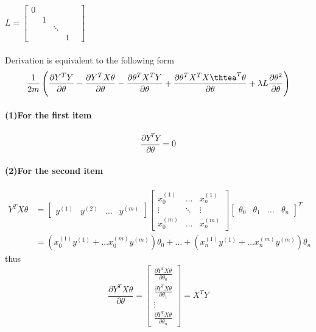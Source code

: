 \documentclass[UTF8]{article}
\begin{document}
$
  L = \left[
  \begin{matrix}
    0 &   &  & \\
      & 1 &  & \\
      &   & \ddots & \\
      &   &  & 1 &
  \end{matrix}
  \right]
$ \\ \\
Derivation is equivalent to the following form
\begin{equation*}
  \frac{1}{2m}\left(
  \frac{\partial Y^TY}{\partial \theta} - \frac{\partial Y^TX\theta}{\partial\theta} - \frac{\partial\theta^TX^TY}{\partial \theta} + \frac{\partial\theta^TX^TX\thtea^T\theta}{\partial\theta} + \lambda L\frac{\partial\theta^2}{\partial\theta}\right)
\end{equation*}

\paragraph{(1)For the first item}
$$\frac{\partial Y^TY}{\partial\theta} = 0$$
\paragraph{(2)For the second item}
\begin{align*}
  Y^TX\theta &=
  \left[
  \begin{matrix}
  y^{(1)} & y^{(2)} & \dots & y^{(m)}
  \end{matrix}
  \right]
  \left[
  \begin{matrix}
      x_0^{(1)} & \dots &x_n^{(1)} \\
      \vdots & \ddots & \vdots \\
      x_0^{(m)} & \dots & x_n^{(m)}
  \end{matrix}
 \right]
  \left[
  \begin{matrix}
    \theta_0 & \theta_1 & \dots & \theta_n
  \end{matrix}
  \right]^T \\
  &= \left(x_0^{(1)}y^{(1)} + \dots x_0^{(m)}y^{(m)} \right)\theta_0
  + \dots + \left(x_n^{(1)}y^{(1)} + \dots x_n^{(m)}y^{(m)} \right)\theta_n
\end{align*}
thus
$$
  \frac{\partial Y^TX\theta}{\partial\theta} = \left[
  \begin{matrix}
    \frac{\partial Y^TX\theta}{\partial\theta_0} \\
    \frac{\partial Y^TX\theta}{\partial\theta_1} \\
    \vdots \\
    \frac{\partial Y^TX\theta}{\partial\theta_n}
  \end{matrix}
  \right] = X^TY
$$
\end{document}
